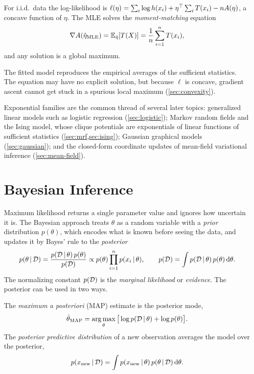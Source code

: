 \begin{proposition}\label{prop:expfam-mle}
For i.i.d.\ data the log-likelihood is $\ell(\eta)=\sum_i\log h(x_i)+\eta^{\top}\sum_iT(x_i)-nA(\eta)$, a concave function of $\eta$. The MLE solves the \emph{moment-matching} equation
\[
\nabla A(\hat\eta_{\mathrm{MLE}})=\mathbb{E}_{\hat\eta}[T(X)]=\frac1n\sum_{i=1}^nT(x_i),
\]
and any solution is a global maximum.
\end{proposition}

The fitted model reproduces the empirical averages of the sufficient statistics. The equation may have no explicit solution, but because $\ell$ is concave, gradient ascent cannot get stuck in a spurious local maximum (\cref{sec:convexity}).

\begin{remark}
Exponential families are the common thread of several later topics: generalized linear models such as logistic regression (\cref{sec:logistic}); Markov random fields and the Ising model, whose clique potentials are exponentials of linear functions of sufficient statistics (\cref{sec:mrf,sec:ising}); Gaussian graphical models (\cref{sec:gaussian}); and the closed-form coordinate updates of mean-field variational inference (\cref{sec:mean-field}).
\end{remark}

\section{Bayesian Inference}\label{sec:bayes-inference}

Maximum likelihood returns a single parameter value and ignores how uncertain it is. The Bayesian approach treats $\theta$ as a random variable with a \emph{prior} distribution $p(\theta)$, which encodes what is known before seeing the data, and updates it by Bayes' rule to the \emph{posterior}
\[
p(\theta\,|\,\mathcal{D})=\frac{p(\mathcal{D}\,|\,\theta)\,p(\theta)}{p(\mathcal{D})}\propto p(\theta)\prod_{i=1}^np(x_i\,|\,\theta),\qquad p(\mathcal{D})=\int p(\mathcal{D}\,|\,\theta)\,p(\theta)\,\mathrm{d}\theta.
\]
The normalizing constant $p(\mathcal{D})$ is the \emph{marginal likelihood} or \emph{evidence}. The posterior can be used in two ways.

\begin{definition}\label{def:map}
The \emph{maximum a posteriori} (MAP) estimate is the posterior mode,
\[
\hat\theta_{\mathrm{MAP}}=\operatorname*{arg\,max}_\theta\big[\log p(\mathcal{D}\,|\,\theta)+\log p(\theta)\big].
\]
The \emph{posterior predictive distribution} of a new observation averages the model over the posterior,
\[
p(x_{\mathrm{new}}\,|\,\mathcal{D})=\int p(x_{\mathrm{new}}\,|\,\theta)\,p(\theta\,|\,\mathcal{D})\,\mathrm{d}\theta.
\]
\end{definition}


